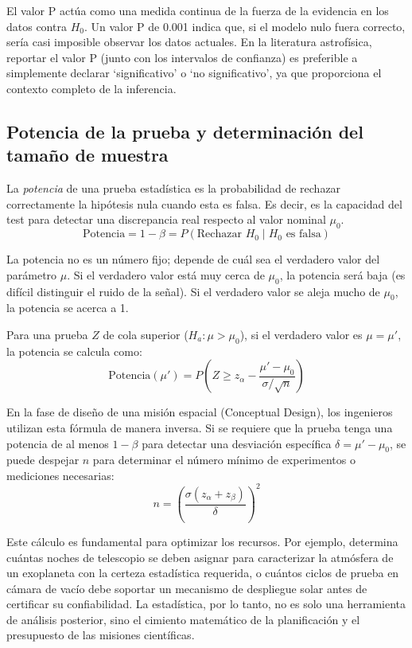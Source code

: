El valor P actúa como una medida continua de la fuerza de la evidencia en los datos contra $H_0$. Un valor P de 0.001 indica que, si el modelo nulo fuera correcto, sería casi imposible observar los datos actuales. En la literatura astrofísica, reportar el valor P (junto con los intervalos de confianza) es preferible a simplemente declarar `significativo' o `no significativo', ya que proporciona el contexto completo de la inferencia.

\subsection{Potencia de la prueba y determinación del tamaño de muestra}

La \textit{potencia} de una prueba estadística es la probabilidad de rechazar correctamente la hipótesis nula cuando esta es falsa. Es decir, es la capacidad del test para detectar una discrepancia real respecto al valor nominal $\mu_0$.
$$ \text{Potencia} = 1 - \beta = P(\text{Rechazar } H_0 \mid H_0 \text{ es falsa}) $$

La potencia no es un número fijo; depende de cuál sea el verdadero valor del parámetro $\mu$. Si el verdadero valor está muy cerca de $\mu_0$, la potencia será baja (es difícil distinguir el ruido de la señal). Si el verdadero valor se aleja mucho de $\mu_0$, la potencia se acerca a 1.

Para una prueba $Z$ de cola superior ($H_a: \mu > \mu_0$), si el verdadero valor es $\mu = \mu'$, la potencia se calcula como:
$$ \text{Potencia}(\mu') = P\left(Z \ge z_{\alpha} - \frac{\mu' - \mu_0}{\sigma / \sqrt{n}}\right) $$

En la fase de diseño de una misión espacial (Conceptual Design), los ingenieros utilizan esta fórmula de manera inversa. Si se requiere que la prueba tenga una potencia de al menos $1 - \beta$ para detectar una desviación específica $\delta = \mu' - \mu_0$, se puede despejar $n$ para determinar el número mínimo de experimentos o mediciones necesarias:
$$ n = \left( \frac{\sigma (z_{\alpha} + z_{\beta})}{\delta} \right)^2 $$

Este cálculo es fundamental para optimizar los recursos. Por ejemplo, determina cuántas noches de telescopio se deben asignar para caracterizar la atmósfera de un exoplaneta con la certeza estadística requerida, o cuántos ciclos de prueba en cámara de vacío debe soportar un mecanismo de despliegue solar antes de certificar su confiabilidad. La estadística, por lo tanto, no es solo una herramienta de análisis posterior, sino el cimiento matemático de la planificación y el presupuesto de las misiones científicas.


